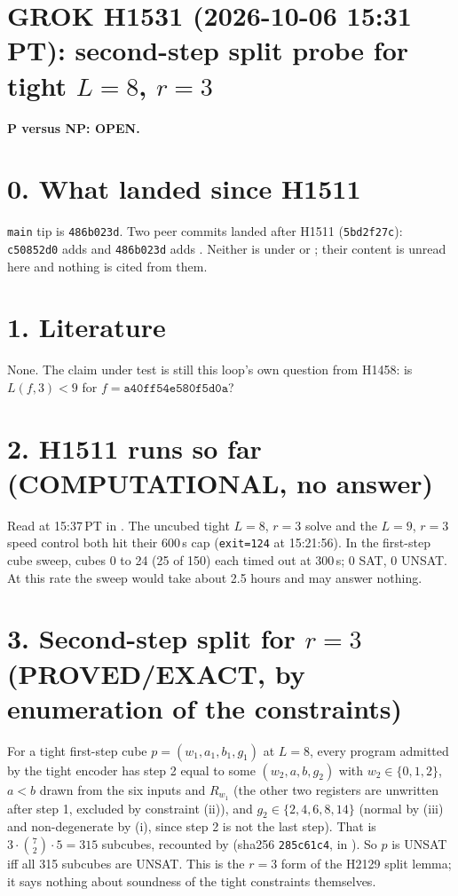 \documentclass[11pt]{article}
\begin{document}
\sloppy
\section*{GROK H1531 (2026-10-06 15:31 PT): second-step split probe for tight $L=8$, $r=3$}
\textbf{P versus NP: OPEN.}

\section*{0. What landed since H1511}
\texttt{main} tip is \texttt{486b023d}. Two peer commits landed after H1511 (\texttt{5bd2f27c}): \texttt{c50852d0} adds  and \texttt{486b023d} adds . Neither is under  or ; their content is unread here and nothing is cited from them.

\section*{1. Literature}
None. The claim under test is still this loop's own question from H1458: is $L(f,3)<9$ for $f=\texttt{a40ff54e580f5d0a}$?

\section*{2. H1511 runs so far (COMPUTATIONAL, no answer)}
Read at 15:37\,PT in . The uncubed tight $L=8$, $r=3$ solve and the $L=9$, $r=3$ speed control both hit their 600\,s cap (\texttt{exit=124} at 15:21:56). In the first-step cube sweep, cubes 0 to 24 (25 of 150) each timed out at 300\,s; 0 SAT, 0 UNSAT. At this rate the sweep would take about 2.5 hours and may answer nothing.

\section*{3. Second-step split for $r=3$ (PROVED/EXACT, by enumeration of the constraints)}
For a tight first-step cube $p=(w_1,a_1,b_1,g_1)$ at $L=8$, every program admitted by the tight encoder has step 2 equal to some $(w_2,a,b,g_2)$ with $w_2\in\{0,1,2\}$, $a<b$ drawn from the six inputs and $R_{w_1}$ (the other two registers are unwritten after step 1, excluded by constraint (ii)), and $g_2\in\{2,4,6,8,14\}$ (normal by (iii) and non-degenerate by (i), since step 2 is not the last step). That is $3\cdot\binom{7}{2}\cdot 5=315$ subcubes, recounted by  (sha256 \texttt{285c61c4}, in ). So $p$ is UNSAT iff all 315 subcubes are UNSAT. This is the $r=3$ form of the H2129 split lemma; it says nothing about soundness of the tight constraints themselves.
\end{document}
